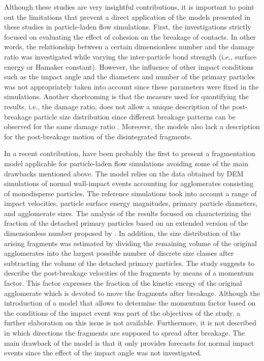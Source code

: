 Although these studies are very insightful contributions, it is
important to point out the limitations that prevent a direct
application of the models presented in these studies in particle-laden
flow simulations. First, the investigations strictly focused on
evaluating the effect of cohesion on the breakage of contacts. In
other words, the relationship between a certain dimensionless number
and the damage ratio was investigated while varying the inter-particle
bond strength (i.e., surface energy or Hamaker constant).  However,
the influence of other impact conditions such as the impact angle and
the diameters and number of the primary particles was not
appropriately taken into account since these parameters were fixed in
the simulations. Another shortcoming is that the measure used for
quantifying the results, i.e., the damage ratio, does not allow a
unique description of the post-breakage particle size distribution
since different breakage patterns can be observed for the same damage
ratio \citep{tong2009numerical}. Moreover, the models also lack a
description for the post-breakage motion of the disintegrated
fragments.

In a recent contribution, \citet{van2020analysis} have been probably
the first to present a fragmentation model applicable for
particle-laden flow simulations avoiding some of the main drawbacks
mentioned above. The model relies on the data obtained by DEM
simulations of normal wall-impact events accounting for agglomerates
consisting of monodisperse particles. The reference simulations took
into account a range of impact velocities, particle surface energy
magnitudes, primary particle diameters, and agglomerate sizes.  The
analysis of the results focused on characterizing the fraction of the
detached primary particles based on an extended version of the
dimensionless number proposed by \citet{moreno2006mechanistic}. In
addition, the size distribution of the arising fragments was estimated
by dividing the remaining volume of the original agglomerates into the
largest possible number of discrete size classes after subtracting the
volume of the detached primary particles. The study suggests to
describe the post-breakage velocities of the fragments by means of a
momentum factor. This factor expresses the fraction of the kinetic
energy of the original agglomerate which is devoted to move the
fragments after breakage. Although the introduction of a model that
allows to determine the momentum factor based on the conditions of the
impact event was part of the objectives of the study, a further
elaboration on this issue is not available. Furthermore, it is not
described in which directions the fragments are supposed to spread
after breakage. The main drawback of the model is that it only
provides forecasts for normal impact events since the effect of the
impact angle was not investigated.

